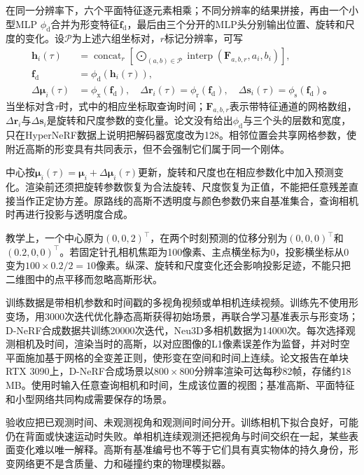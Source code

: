 在同一分辨率下，六个平面特征逐元素相乘；不同分辨率的结果拼接，再由一个小型MLP $\phi_{\mathrm d}$合并为形变特征$\bm f_{\mathrm d}$，最后由三个分开的MLP头分别输出位置、旋转和尺度的变化。设$\mathcal P$为上述六组坐标对，$r$标记分辨率，可写
\begin{equation}
 \begin{aligned}
 \bm h_i(\tau)
 &=\mathop{\operatorname{concat}}_r
   \left[
    \mathop{\bigodot}_{(a,b)\in\mathcal P}
       \operatorname{interp}
        (\bm F_{a,b,r},a_i,b_i)
   \right],\\
 \bm f_{\mathrm d}&=\phi_{\mathrm d}(\bm h_i(\tau)),\\
 \Delta\bm\mu_i(\tau)&=\phi_{\mathrm x}(\bm f_{\mathrm d}),\quad
 \Delta\bm r_i(\tau)=\phi_{\mathrm r}(\bm f_{\mathrm d}),\quad
 \Delta\bm s_i(\tau)=\phi_{\mathrm s}(\bm f_{\mathrm d})\text{。}
 \end{aligned}
 \label{eq:vision-4d-planes}
\end{equation}
当坐标对含$\tau$时，式中的相应坐标取查询时间；$\bm F_{a,b,r}$表示带特征通道的网格数组，$\Delta\bm r_i$与$\Delta\bm s_i$是旋转和尺度参数的变化量。论文没有给出$\phi_{\mathrm d}$与三个头的层数和宽度，只在HyperNeRF数据上说明把解码器宽度改为128。相邻位置会共享网格参数，使附近高斯的形变具有共同表示，但不会强制它们属于同一个刚体。

中心按$\bm\mu_i(\tau)=\bm\mu_i+\Delta\bm\mu_i(\tau)$更新，旋转和尺度也在相应参数化中加入预测变化。渲染前还须把旋转参数恢复为合法旋转、尺度恢复为正值，不能把任意残差直接当作正定协方差。原路线的高斯不透明度与颜色参数仍来自基准集合，查询相机时再进行投影与透明度合成。

教学上，一个中心原为$(0,0,2)^\top$，在两个时刻预测的位移分别为$(0,0,0)^\top$和$(0.2,0,0)^\top$。若固定针孔相机焦距为100像素、主点横坐标为0，投影横坐标从0变为$100\times0.2/2=10$像素。纵深、旋转和尺度变化还会影响投影足迹，不能只把二维图中的点平移而忽略高斯形状。

训练数据是带相机参数和时间戳的多视角视频或单相机连续视频。训练先不使用形变场，用3000次迭代优化静态高斯获得初始场景，再联合学习基准表示与形变场；D-NeRF合成数据共训练20000次迭代，Neu3D多相机数据为14000次。每次选择观测相机及时间，渲染当时的高斯，以对应图像的L1像素误差作为监督，并对时空平面施加基于网格的全变差正则，使形变在空间和时间上连续。论文报告在单块RTX 3090上，D-NeRF合成场景以$800\times800$分辨率渲染可达每秒82帧，存储约18 MB。使用时输入任意查询相机和时间，生成该位置的视图；基准高斯、平面特征和小型网络共同构成需要保存的场景。

验收应把已观测时间、未观测视角和观测间时间分开。训练相机下拟合良好，可能仍在背面或快速运动时失败。单相机连续观测还把视角与时间交织在一起，某些表面变化难以唯一解释。高斯有基准编号也不等于它们具有真实物体的持久身份，形变网络更不是含质量、力和碰撞约束的物理模拟器。


